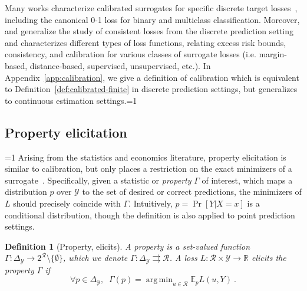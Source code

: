 \documentclass{article}
\newcommand{\Comments}{1}
\newcommand{\mynote}[2]{\ifnum\Comments=1\textcolor{#1}{#2}\fi}
\newcommand{\mytodo}[2]{\ifnum\Comments=1%
	\todo[linecolor=#1!80!black,backgroundcolor=#1,bordercolor=#1!80!black]{#2}\fi}
\newcommand{\raft}[1]{\mytodo{green!20!white}{RF: #1}}
\newcommand{\jessie}[1]{\mynote{purple}{[JF: #1]}}
\newcommand{\jessiet}[1]{\mytodo{purple!20!white}{JF: #1}}
\newcommand{\btw}[1]{\mytodo{gray!10!white}{\textcolor{gray}{BTW: #1}}}%
\newcommand{\reals}{\mathbb{R}}
\newcommand{\simplex}{\Delta_\Y}
\newcommand{\E}{\mathbb{E}}
\newcommand{\R}{\mathcal{R}}
\newcommand{\Y}{\mathcal{Y}}
\newcommand{\exploss}[3]{\E_{#3} #1(#2,Y)}
\newcommand{\toto}{\rightrightarrows}
\newtheorem{definition}{Definition}
\DeclareMathOperator*{\argmin}{arg\,min}
\begin{document}
Many works characterize calibrated surrogates for specific discrete target losses~\citep{zhang2004statistical,lin2004note,bartlett2006convexity,tewari2007consistency}, including the canonical 0-1 loss for binary and multiclass classification.
Moreover, \citet{steinwart2007compare} and \citet{steinwart2008support} generalize the study of consistent losses from the discrete prediction setting and characterizes different types of loss functions, relating excess risk bounds, consistency, and calibration for various classes of surrogate losses (i.e. margin-based, distance-based, supervised, unsupervised, etc.).
In Appendix~\ref{app:calibration}, we give a definition of calibration which is equivalent to Definition~\ref{def:calibrated-finite} in discrete prediction settings, but generalizes to continuous estimation settings.\jessiet{Suggest trimming down if needed}


\subsection{Property elicitation}\label{subsec:properties}
\btw{Don't be too braggy}
Arising from the statistics and economics literature, property elicitation is similar to calibration, but only places a restriction on the exact minimizers of a surrogate~\citep{savage1971elicitation,osband1985information-eliciting,lambert2008eliciting,lambert2009eliciting,lambert2018elicitation,frongillo2015vector-valued,frongillo2014general}.
Specifically, given a statistic or \emph{property} $\Gamma$ of interest, which maps a distribution $p$ over $\Y$ to the set of desired or correct predictions, the minimizers of $L$ should precisely coincide with $\Gamma$.
Intuitively, $p = \Pr[Y|X=x]$ is a conditional distribution, though the definition is also applied to point prediction settings.

\begin{definition}[Property, elicits]
	A \emph{property} is a set-valued function $\Gamma : \simplex \to 2^\R \setminus \{\emptyset\}$, which we denote $\Gamma: \simplex \toto \R$.
	A loss $L : \R \times \Y \to \reals$ \emph{elicits} the property $\Gamma$ if
	\begin{equation}
    \label{eq:elic}    
    \forall p \in \simplex, \;\; \Gamma(p) = \argmin_{u \in \R} \exploss{L}{u}{p}~.
	\end{equation}
\end{definition}
\end{document}
